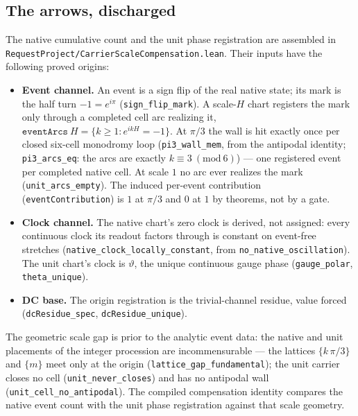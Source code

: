 \documentclass[11pt]{article}
\theoremstyle{definition}
\begin{document}
\subsection{The arrows, discharged}
The native cumulative count and the unit phase registration are assembled in
\texttt{RequestProject/CarrierScaleCompensation.lean}.  Their inputs have the
following proved origins:
\begin{itemize}
\item \textbf{Event channel.}  An event is a sign flip of the real native
state; its mark is the half turn \(-1=e^{i\pi}\) (\texttt{sign\_flip\_mark}).
A scale-\(H\) chart registers the mark only through a completed cell arc
realizing it, \(\texttt{eventArcs}\ H=\{k\ge 1: e^{ikH}=-1\}\).  At \(\pi/3\)
the wall is hit exactly once per closed six-cell monodromy loop
(\texttt{pi3\_wall\_mem}, from the antipodal identity;
\texttt{pi3\_arcs\_eq}: the arcs are exactly \(k\equiv 3\ (\mathrm{mod}\ 6)\))
--- one registered event per completed native cell.  At scale \(1\) no arc
ever realizes the mark (\texttt{unit\_arcs\_empty}).  The induced per-event
contribution (\texttt{eventContribution}) is \(1\) at \(\pi/3\) and \(0\) at
\(1\) by theorems, not by a gate.
\item \textbf{Clock channel.}  The native chart's zero clock is derived, not
assigned: every continuous clock its readout factors through is constant on
event-free stretches (\texttt{native\_clock\_locally\_constant}, from
\texttt{no\_native\_oscillation}).  The unit chart's clock is \(\vartheta\), the
unique continuous gauge phase (\texttt{gauge\_polar}, \texttt{theta\_unique}).
\item \textbf{DC base.}  The origin registration is the trivial-channel
residue, value forced (\texttt{dcResidue\_spec}, \texttt{dcResidue\_unique}).
\end{itemize}
The geometric scale gap is prior to the analytic event data: the
native and unit placements of the integer procession are incommensurable ---
the lattices \(\{k\,\pi/3\}\) and \(\{m\}\) meet only at the origin
(\texttt{lattice\_gap\_fundamental}); the unit carrier closes no cell
(\texttt{unit\_never\_closes}) and has no antipodal wall
(\texttt{unit\_cell\_no\_antipodal}).  The compiled compensation identity
compares the native event count with the unit phase registration against
that scale geometry.
\end{document}
